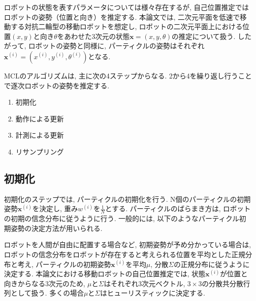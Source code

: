 ロボットの状態を表すパラメータについては様々存在するが, 自己位置推定ではロボットの姿勢（位置と向き）を推定する. 
本論文では, 二次元平面を低速で移動する対抗二輪型の移動ロボットを想定し, ロボットの二次元平面上における位置$(x, y)$と向き$\theta$をあわせた3次元の状態$\bm{x} = (x, y, \theta)$の推定について扱う. 
したがって, ロボットの姿勢と同様に, パーティクルの姿勢はそれぞれ$\bm{x}^{(i)} = (x^{(i)}, y^{(i)}, \theta^{(i)})$となる. 


MCLのアルゴリズムは, 主に次の4ステップからなる. 
2から4を繰り返し行うことで逐次ロボットの姿勢を推定する. 
\begin{enumerate}
  \item 初期化
  \item 動作による更新
  \item 計測による更新
  \item リサンプリング
\end{enumerate}




\subsection{初期化}

初期化のステップでは, パーティクルの初期化を行う. 
N個のパーティクルの初期姿勢$\bm{x}^{(i)}$を決定し, 重み$w^{(i)}$を$\frac{1}{N}$とする. 
パーティクルのばらまき方は, ロボットの初期の信念分布に従うように行う. 
一般的には, 以下のようなパーティクル初期姿勢の決定方法が用いられる. 

ロボットを人間が自由に配置する場合など, 初期姿勢が予め分かっている場合は, ロボットの信念分布をロボットが存在すると考えられる位置を平均とした正規分布と考え, 
パーティクルの初期姿勢$\bm{x}^{(i)}$を平均$\mu$, 分散$\Sigma$の正規分布に従うように決定する. 
本論文における移動ロボットの自己位置推定では, 状態$\bm{x}^{(i)}$が位置と向きからなる3次元のため, $\mu$と$\Sigma$はそれぞれ3次元ベクトル, $3\times3$の分散共分散行列として扱う. 
多くの場合$\mu$と$\Sigma$はヒューリスティックに決定する. 


